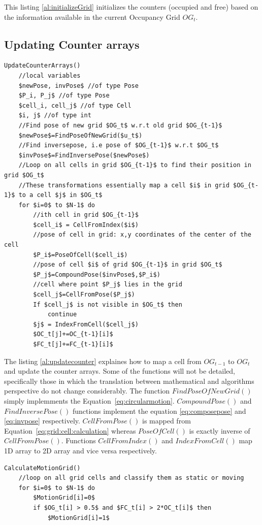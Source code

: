 This listing \ref{al:initializeGrid} initializes the counters (occupied and free) based on the information available in the current Occupancy Grid $OG_t$.

\subsection{Updating Counter arrays}

\begin{lstlisting}[label=al:updatecounter,mathescape=true,caption={Update counter arrays}]
UpdateCounterArrays()
	//local variables
	$newPose, invPose$ //of type Pose
	$P_i, P_j$ //of type Pose
	$cell_i, cell_j$ //of type Cell
	$i, j$ //of type int
	//Find pose of new grid $OG_t$ w.r.t old grid $OG_{t-1}$
	$newPose$=FindPoseOfNewGrid($u_t$)
	//Find inversepose, i.e pose of $OG_{t-1}$ w.r.t $OG_t$
	$invPose$=FindInversePose($newPose$)
	//Loop on all cells in grid $OG_{t-1}$ to find their position in grid $OG_t$
	//These transformations essentially map a cell $i$ in grid $OG_{t-1}$ to a cell $j$ in $OG_t$
	for $i=0$ to $N-1$ do
		//ith cell in grid $OG_{t-1}$
		$cell_i$ = CellFromIndex($i$)
		//pose of cell in grid: x,y coordinates of the center of the cell
		$P_i$=PoseOfCell($cell_i$)
		//pose of cell $i$ of grid $OG_{t-1}$ in grid $OG_t$
		$P_j$=CompoundPose($invPose$,$P_i$)
		//cell where point $P_j$ lies in the grid
		$cell_j$=CellFromPose($P_j$)
		If $cell_j$ is not visible in $OG_t$ then
			continue
		$j$ = IndexFromCell($cell_j$)
		$OC_t[j]+=OC_{t-1}[i]$
		$FC_t[j]+=FC_{t-1}[i]$
\end{lstlisting}
The listing \ref{al:updatecounter} explaines how to map a cell from $OG_{t-1}$ to $OG_t$ and update the counter arrays. Some of the functions will not be detailed, specifically those in which the translation between mathematical and algorithms perspective do not change considerably.
The function $FindPoseOfNewGrid()$ simply implemments the Equation~\ref{eq:circularmotion}. $CompoundPose()$ and \\$FindInversePose()$ functions implement the equation \ref{eq:composepose} and \ref{eq:invpose}  respectively. $CellFromPose()$ is mapped from Equation~\ref{eq:grid:cell:calculation} whereas $PoseOfCell()$ is exactly inverse of $CellFromPose()$. Functions $CellFromIndex()$ and $IndexFromCell()$ map 1D array to 2D array and vice versa respectively.

\begin{lstlisting}[label=al:motiongrid,mathescape=true,caption={Calculate motion grid}]
CalculateMotionGrid()
	//loop on all grid cells and classify them as static or moving
	for $i=0$ to $N-1$ do
		$MotionGrid[i]=0$
		if $OG_t[i] > 0.5$ and $FC_t[i] > 2*OC_t[i]$ then
			$MotionGrid[i]=1$
\end{lstlisting}

